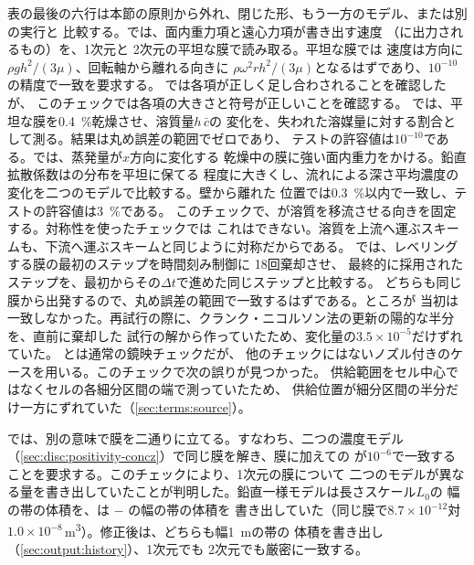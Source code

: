 表の最後の六行は本節の原則から外れ、閉じた形、もう一方のモデル、または別の実行と
比較する。では、面内重力項と遠心力項が書き出す速度
（に出力されるもの）を、1次元と 2次元の平坦な膜で読み取る。平坦な膜では
速度は方向に$\rho g h^2/(3\mu)$、回転軸から離れる向きに
$\rho\omega^2 r h^2/(3\mu)$となるはずであり、$10^{-10}$の精度で一致を要求する。
では各項が正しく足し合わされることを確認したが、
このチェックでは各項の大きさと符号が正しいことを確認する。
では、平坦な膜を\SI{0.4}{\percent}乾燥させ、溶質量$h\,\bar c$の
変化を、失われた溶媒量に対する割合として測る。結果は丸め誤差の範囲でゼロであり、
テストの許容値は$10^{-10}$である。では、蒸発量が$x$方向に変化する
乾燥中の膜に強い面内重力をかける。鉛直拡散係数はの分布を平坦に保てる
程度に大きくし、流れによる深さ平均濃度の変化を二つのモデルで比較する。壁から離れた
位置では\SI{0.3}{\percent}以内で一致し、テストの許容値は\SI{3}{\percent}である。
このチェックで、が溶質を移流させる向きを固定する。対称性を使ったチェックでは
これはできない。溶質を上流へ運ぶスキームも、下流へ運ぶスキームと同じように対称だからである。
では、レベリングする膜の最初のステップを時間刻み制御に 18回棄却させ、
最終的に採用されたステップを、最初からその$\Delta t$で進めた同じステップと比較する。
どちらも同じ膜から出発するので、丸め誤差の範囲で一致するはずである。ところが
当初は一致しなかった。再試行の際に、クランク・ニコルソン法の更新の陽的な半分を、直前に棄却した
試行の解から作っていたため、変化量の$3.5\times10^{-5}$だけずれていた。
とは通常の鏡映チェックだが、
他のチェックにはないノズル付きのケースを用いる。このチェックで次の誤りが見つかった。
供給範囲をセル中心ではなくセルの各細分区間の端で測っていたため、
供給位置が細分区間の半分だけ一方にずれていた（\cref{sec:terms:source}）。

では、別の意味で膜を二通りに立てる。すなわち、二つの濃度モデル
（\cref{sec:disc:positivity-concz}）で同じ膜を解き、膜に加えての
が$10^{-6}$で一致することを要求する。このチェックにより、1次元の膜について
二つのモデルが異なる量を書き出していたことが判明した。鉛直一様モデルは長さスケール$L_0$の
幅の帯の体積を、は $-$ の幅の帯の体積を
書き出していた（同じ膜で$8.7\times10^{-12}$対
$1.0\times10^{-8}$\,\si{\metre\cubed}）。修正後は、どちらも幅\SI{1}{\metre}の帯の
体積を書き出し（\cref{sec:output:history}）、1次元でも 2次元でも厳密に一致する。


